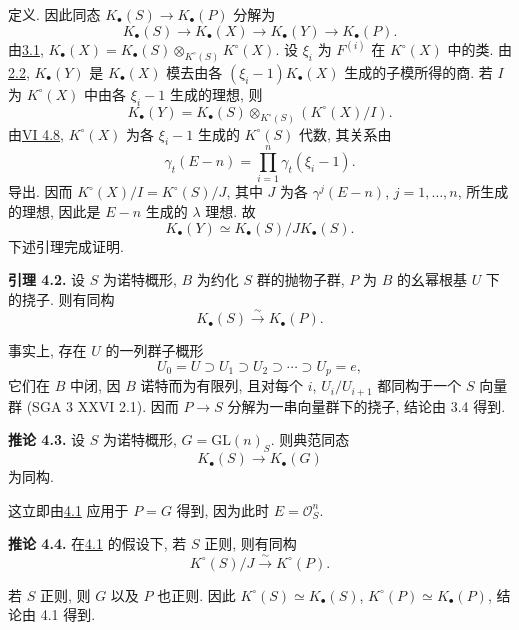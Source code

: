 定义. 因此同态 $K_\bullet(S)\to K_\bullet(P)$ 分解为
\[
 K_\bullet(S)\longrightarrow K_\bullet(X)\longrightarrow K_\bullet(Y)\longrightarrow K_\bullet(P).
\]
由\hyperlink{sga6.e09.prop.3-1}{3.1}, $K_\bullet(X)=K_\bullet(S)\otimes_{K^\circ(S)}K^\circ(X)$. 设 $\xi_i$ 为 $F^{(i)}$ 在 $K^\circ(X)$ 中的类. 由\hyperlink{sga6.e09.prop.2-2}{2.2}, $K_\bullet(Y)$ 是 $K_\bullet(X)$ 模去由各 $(\xi_i-1)K_\bullet(X)$ 生成的子模所得的商. 若 $I$ 为 $K^\circ(X)$ 中由各 $\xi_i-1$ 生成的理想, 则
\[
 K_\bullet(Y)=K_\bullet(S)\otimes_{K^\circ(S)}(K^\circ(X)/I).
\]
由\hyperlink{sga6.e06.cor.4-8}{VI 4.8}, $K^\circ(X)$ 为各 $\xi_i-1$ 生成的 $K^\circ(S)$ 代数, 其关系由
\[
 \gamma_t(E-n)=\prod_{i=1}^n\gamma_t(\xi_i-1).
\]
导出. 因而 $K^\circ(X)/I=K^\circ(S)/J$, 其中 $J$ 为各 $\gamma^j(E-n)$, $j=1,\ldots,n$, 所生成的理想, 因此是 $E-n$ 生成的 $\lambda$ 理想. 故
\[
 K_\bullet(Y)\simeq K_\bullet(S)/J K_\bullet(S).
\]
下述引理完成证明.

\textbf{引理 4.2.} 设 $S$ 为诺特概形, $B$ 为约化 $S$ 群的抛物子群, $P$ 为 $B$ 的幺幂根基 $U$ 下的挠子. 则有同构
\[
 K_\bullet(S)\xrightarrow{\sim}K_\bullet(P).
\]

事实上, 存在 $U$ 的一列群子概形
\[
 U_0=U\supset U_1\supset U_2\supset\cdots\supset U_p=e,
\]
它们在 $B$ 中闭, 因 $B$ 诺特而为有限列, 且对每个 $i$, $U_i/U_{i+1}$ 都同构于一个 $S$ 向量群 (SGA 3 XXVI 2.1). 因而 $P\to S$ 分解为一串向量群下的挠子, 结论由 3.4 得到.

\textbf{推论 4.3.} 设 $S$ 为诺特概形, $G=\mathrm{GL}(n)_S$. 则典范同态
\[
 K_\bullet(S)\longrightarrow K_\bullet(G)
\]
为同构.

这立即由\hyperlink{sga6.e09.prop.4-1}{4.1} 应用于 $P=G$ 得到, 因为此时 $E=\mathcal O_S^n$.

\textbf{推论 4.4.} 在\hyperlink{sga6.e09.prop.4-1}{4.1} 的假设下, 若 $S$ 正则, 则有同构
\[
 K^\circ(S)/J\xrightarrow{\sim}K^\circ(P).
\]

若 $S$ 正则, 则 $G$ 以及 $P$ 也正则. 因此 $K^\circ(S)\simeq K_\bullet(S)$, $K^\circ(P)\simeq K_\bullet(P)$, 结论由 4.1 得到.

